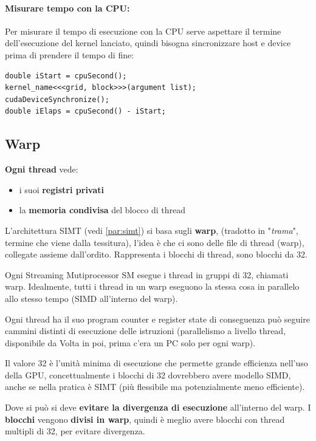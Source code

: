 \paragraph{Misurare tempo con la CPU:} Per misurare il tempo di esecuzione con la CPU serve aspettare il termine dell'esecuzione del kernel lanciato, quindi bisogna sincronizzare host e device prima di prendere il tempo di fine:
\begin{verbatim}
double iStart = cpuSecond();
kernel_name<<<grid, block>>>(argument list);
cudaDeviceSynchronize();
double iElaps = cpuSecond() - iStart;
\end{verbatim}


\subsection{Warp}

\textbf{Ogni thread} vede: 
\begin{itemize}
	\item i suoi \textbf{registri privati}
	\item la \textbf{memoria condivisa} del blocco di thread
\end{itemize}

L'architettura SIMT (vedi \ref{par:simt}) si basa sugli \textbf{warp}, (tradotto in "\textit{trama}", termine che viene dalla tessitura), l'idea è che ci sono delle file di thread (warp), collegate assieme dall'ordito. Rappresenta i blocchi di thread, sono blocchi da 32. 

Ogni Streaming Mutiprocessor SM esegue i thread in gruppi di 32, chiamati warp. Idealmente, tutti i thread in un warp eseguono la stessa cosa in parallelo allo stesso tempo (SIMD all'interno del warp).

Ogni thread ha il suo program counter e register state di conseguenza può seguire cammini distinti di esecuzione delle istruzioni (parallelismo a livello thread, disponibile da Volta in poi, prima c'era un PC solo per ogni warp).

Il valore 32 è l'unità minima di esecuzione che permette grande efficienza nell'uso della GPU, concettualmente i blocchi di 32 dovrebbero avere modello SIMD, anche se nella pratica è SIMT (più flessibile ma potenzialmente meno efficiente). 

Dove si può si deve \textbf{evitare la divergenza di esecuzione} all'interno del warp. I \textbf{blocchi} vengono \textbf{divisi in warp}, quindi è meglio avere blocchi con thread multipli di 32, per evitare divergenza.

